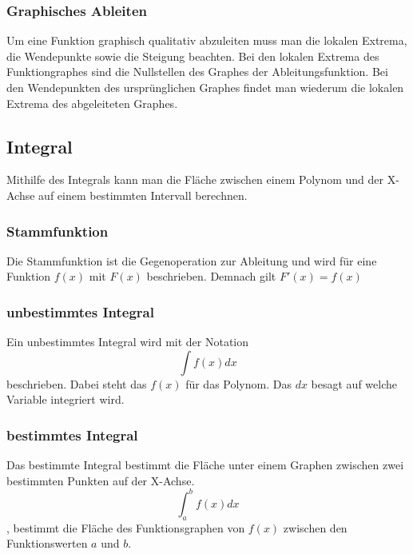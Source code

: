 \documentclass{article}
\begin{document}
\subsubsection{Graphisches Ableiten}
Um eine Funktion graphisch qualitativ abzuleiten muss man die lokalen Extrema, die Wendepunkte sowie die Steigung beachten. Bei den lokalen Extrema des Funktiongraphes sind die Nullstellen des Graphes der Ableitungsfunktion. Bei den Wendepunkten des ursprünglichen Graphes findet man wiederum die lokalen Extrema des abgeleiteten Graphes.
\subsection{Integral}
Mithilfe des Integrals kann man die Fläche zwischen einem Polynom und der X-Achse auf einem bestimmten Intervall berechnen.
\subsubsection{Stammfunktion}
Die Stammfunktion ist die Gegenoperation zur Ableitung und wird für eine Funktion \(f(x)\) mit \(F(x)\) beschrieben. Demnach gilt \(F'(x) = f(x)\)
\subsubsection{unbestimmtes Integral}
Ein unbestimmtes Integral wird mit der Notation
\[
		\int f(x)dx
\]
beschrieben. Dabei steht das \(f(x)\) für das Polynom. Das \(dx\) besagt auf welche Variable integriert wird.
\subsubsection{bestimmtes Integral}
Das bestimmte Integral bestimmt die Fläche unter einem Graphen zwischen zwei bestimmten Punkten auf der X-Achse.
$$ \int_a^b f(x)dx$$
, bestimmt die Fläche des Funktionsgraphen von $f(x)$ zwischen den Funktionswerten $a$ und $b$.
\end{document}
